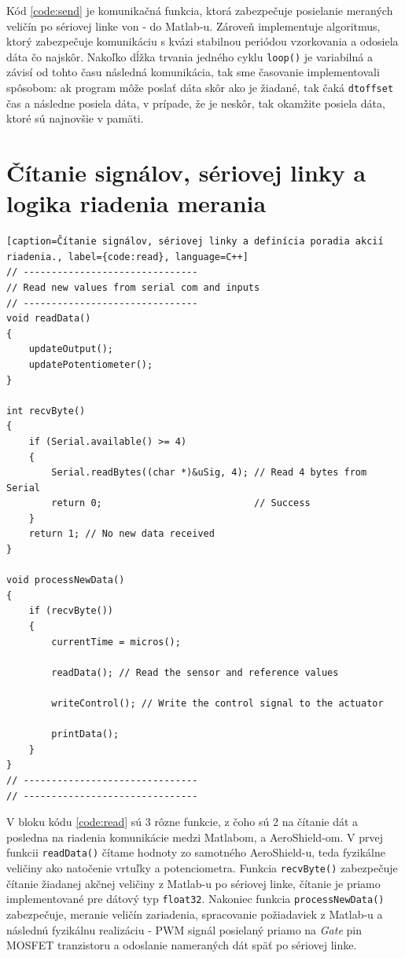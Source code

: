\documentclass[a4paper, 10pt, ]{article}
\begin{document}
Kód \ref{code:send} je komunikačná funkcia, ktorá zabezpečuje posielanie meraných veličín po sériovej linke von - do Matlab-u. Zároveň implementuje algoritmus, ktorý zabezpečuje komunikáciu s kvázi stabilnou periódou vzorkovania a odosiela dáta čo najskôr. Nakoľko dĺžka trvania jedného cyklu \texttt{loop()} je variabilná a závisí od tohto času následná komunikácia, tak sme časovanie implementovali spôsobom: ak program môže poslať dáta skôr ako je žiadané, tak čaká \texttt{dtoffset} čas a následne posiela dáta, v prípade, že je neskôr, tak okamžite posiela dáta, ktoré sú najnovšie v pamäti.

\section{Čítanie signálov, sériovej linky a logika riadenia merania}
\begin{lstlisting}[caption=Čítanie signálov, sériovej linky a definícia poradia akcií riadenia., label={code:read}, language=C++]
// -------------------------------
// Read new values from serial com and inputs
// -------------------------------
void readData()
{
    updateOutput();
    updatePotentiometer();
}

int recvByte()
{
    if (Serial.available() >= 4)
    {
        Serial.readBytes((char *)&uSig, 4); // Read 4 bytes from Serial
        return 0;                           // Success
    }
    return 1; // No new data received
}

void processNewData()
{
    if (recvByte())
    {
        currentTime = micros();

        readData(); // Read the sensor and reference values

        writeControl(); // Write the control signal to the actuator

        printData();
    }
}
// -------------------------------
// -------------------------------
\end{lstlisting}

V bloku kódu \ref{code:read} sú 3 rôzne funkcie, z čoho sú 2 na čítanie dát a posledna na riadenia komunikácie medzi Matlabom, a AeroShield-om. V prvej funkcii \texttt{readData()} čítame hodnoty zo samotného AeroShield-u, teda fyzikálne veličiny ako natočenie vrtuľky a potenciometra. Funkcia \texttt{recvByte()} zabezpečuje čítanie žiadanej akčnej veličiny z Matlab-u po sériovej linke, čítanie je priamo implementované pre dátový typ \texttt{float32}. Nakoniec funkcia \texttt{processNewData()} zabezpečuje, meranie veličín zariadenia, spracovanie požiadaviek z Matlab-u a následnú fyzikálnu realizáciu - PWM signál posielaný priamo na \emph{Gate} pin MOSFET tranzistoru a odoslanie nameraných dát späť po sériovej linke.
\end{document}
